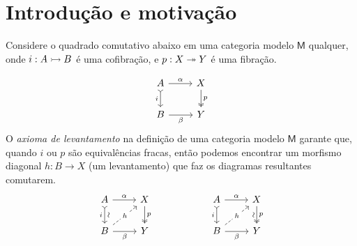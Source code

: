 



\maketitle


\section{Introdução e motivação}

Considere o quadrado comutativo abaixo em uma categoria modelo $\mathsf{M}$ qualquer, onde $i: A \rightarrowtail B$ é uma cofibração, e $p: X \twoheadrightarrow Y$ é uma fibração.

\begin{displaymath}
  \begin{tikzcd}
    A
    \arrow[r, "\alpha"]
    \arrow[d, tail, "i" swap]
    & X
    \arrow[d, two heads, "p"]
    \\ B
    \arrow[r, "\beta" swap]
    & Y
  \end{tikzcd}
\end{displaymath}
O \emph{axioma de levantamento} na definição de uma categoria modelo $\mathsf{M}$ garante que, quando $i$ ou $p$ são equivalências fracas, então podemos encontrar um morfismo diagonal $h: B \to X$  (um levantamento) que faz os diagramas resultantes comutarem.
\begin{displaymath}
  \begin{tikzcd}
     A
    \arrow[r, "\alpha"]
    \arrow[d, tail, "i" {swap}, "\sim" {sloped}]
    & X
    \arrow[d, two heads, "p"]
    \\ B
    \arrow[r, "\beta" swap]
    \arrow[ru, dashed, "h" description]
    & Y
  \end{tikzcd}
  \hspace{2cm}
  \begin{tikzcd}
     A
    \arrow[r, "\alpha"]
    \arrow[d, tail, "i" swap]
    & X
    \arrow[d, two heads, "p", "\sim" {swap,sloped}]
    \\ B
    \arrow[r, "\beta" swap]
    \arrow[ru, dashed, "h" description]
    & Y
  \end{tikzcd}
\end{displaymath}

